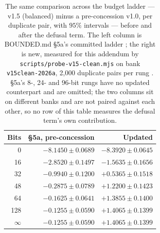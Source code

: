 \documentclass[11pt]{article}
\newcommand{\code}[1]{\texttt{#1}}
\begin{document}
\begin{table}[t]
\centering
\caption{The same comparison across the budget ladder --- v1.5 (balanced) minus a
pre-concession v1.0, per duplicate pair, with $95\%$ intervals --- before and after the defusal
term. The left column is BOUNDED.md \S5a's committed ladder \cite{bounded}; the right is new,
measured for this addendum by \code{scripts/probe-v15-clean.mjs} on bank \code{v15clean-2026a},
2{,}000 duplicate pairs per rung \cite{v15clean}. \S5a's 8-, 24- and 96-bit rungs have no updated
counterpart and are omitted; the two columns sit on different banks and are not paired against
each other, so no row of this table measures the defusal term's own contribution.}
\label{tab:defusalladder}
\footnotesize
\begin{tabular}{@{}rrr@{}}
\toprule
Bits & \S5a, pre-concession & Updated \\
\midrule
0        & $-8.1450 \pm 0.0689$ & $-8.3920 \pm 0.0645$ \\
16       & $-2.8520 \pm 0.1497$ & $-1.5635 \pm 0.1656$ \\
32       & $-0.9940 \pm 0.1200$ & $+0.5365 \pm 0.1518$ \\
48       & $-0.2875 \pm 0.0789$ & $+1.2200 \pm 0.1423$ \\
64       & $-0.1625 \pm 0.0641$ & $+1.3855 \pm 0.1400$ \\
128      & $-0.1255 \pm 0.0590$ & $+1.4065 \pm 0.1399$ \\
$\infty$ & $-0.1255 \pm 0.0590$ & $+1.4065 \pm 0.1399$ \\
\bottomrule
\end{tabular}
\end{table}
\end{document}
